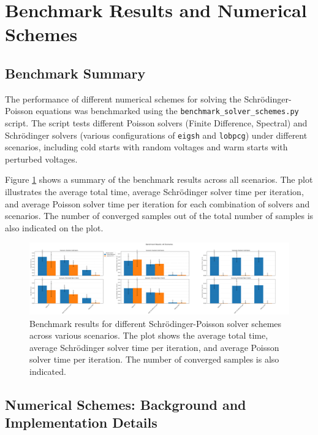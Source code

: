 \documentclass{article}
\begin{document}
\section{Benchmark Results and Numerical Schemes}

\subsection{Benchmark Summary}

The performance of different numerical schemes for solving the Schrödinger-Poisson equations was benchmarked using the \texttt{benchmark\_solver\_schemes.py} script. The script tests different Poisson solvers (Finite Difference, Spectral) and Schrödinger solvers (various configurations of \texttt{eigsh} and \texttt{lobpcg}) under different scenarios, including cold starts with random voltages and warm starts with perturbed voltages.

Figure \ref{fig:benchmark_summary} shows a summary of the benchmark results across all scenarios. The plot illustrates the average total time, average Schrödinger solver time per iteration, and average Poisson solver time per iteration for each combination of solvers and scenarios. The number of converged samples out of the total number of samples is also indicated on the plot.

\begin{figure}[h!]
	\centering
	\includegraphics[width=\textwidth]{../figures/benchmark_summary_all_scenarios.png}
	\caption{Benchmark results for different Schrödinger-Poisson solver schemes across various scenarios. The plot shows the average total time, average Schrödinger solver time per iteration, and average Poisson solver time per iteration. The number of converged samples is also indicated.}
	\label{fig:benchmark_summary}
\end{figure}

\subsection{Numerical Schemes: Background and Implementation Details}
\end{document}
